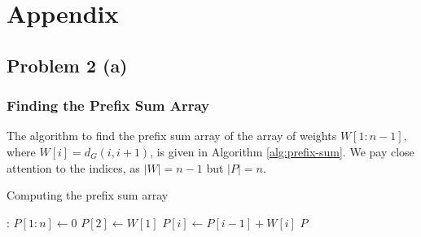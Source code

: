 \documentclass[9pt]{article}
\begin{document}
\section*{Appendix}
\subsection*{Problem 2 (a)}
\subsubsection*{Finding the Prefix Sum Array}
The algorithm to find the prefix sum array of the array of weights $W[1:n-1]$, where
$W[i] = d_{G}(i, i+1)$, is given in Algorithm \ref{alg:prefix-sum}. We pay close attention
to the indices, as $|W| = n-1$ but $|P| = n$.
\begin{algorithm}
    \caption{Computing the prefix sum array}
    \label{alg:prefix-sum}
    \begin{algorithmic}[1]
        :
            \State $P[1:n] \gets 0$
            \State $P[2] \gets W[1]$
                \State $P[i] \gets P[i-1] + W[i]$
            \EndFor
            \State \Return $P$
        \EndProcedure
    \end{algorithmic}
\end{algorithm}
\end{document}
